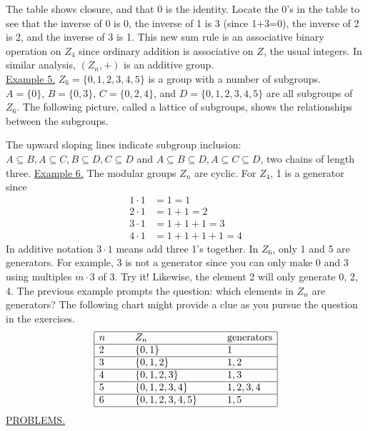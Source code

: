 \documentclass[12pt]{book}
\theoremstyle{definition}
\begin{document}
The table shows closure, and that 0 is the identity.  Locate the 0's in the table to see that the inverse of 0 is 0, the inverse of 1 is 3 (since 1+3=0), the inverse of 2 is 2, and the inverse of 3 is 1.  This new sum rule is an associative binary operation on $Z_4$ since ordinary addition is associative on $Z$, the usual integers.  In similar analysis, $(Z_n,+)$ is an additive group.\\
\underline{Example 5.}  $Z_6 = \{0,1,2,3,4,5\}$ is a group with a number of subgroups.  $A=\{0\},\, B=\{0,3\},\, C=\{0,2,4\}$, and $D=\{0,1,2,3,4,5\}$ are all subgroups of $Z_6$.  The following picture, called a lattice of subgroups, shows the relationships between the subgroups.\\[.1in]
\centerline{}
The upward sloping lines indicate subgroup inclusion: $A\subseteq B, A\subseteq C, B\subseteq D, C\subseteq D$ and $A\subseteq B\subseteq D, A\subseteq C\subseteq D$, two chains of length three.
%
\underline{Example 6.}  The modular groups $Z_n$ are cyclic.  For $Z_4$, 1 is a generator since
\begin{equation*}\begin{split}
1\cdot 1&= 1=1\\
2\cdot 1 &=1+1=2\\
3\cdot 1 &=1+1+1 = 3\\
4\cdot 1 &=1+1+1+1 =4
\end{split}\end{equation*}
In additive notation $3\cdot 1$ means add three 1's together.  In $Z_6$, only 1 and 5 are generators.  For example, 3 is not a generator since you can only make 0 and 3 using multiples $m\cdot3$ of 3.  Try it!  Likewise, the element 2 will only generate 0, 2, 4.  The previous example prompts the question: which elements in $Z_n$ are generators?  The following chart might provide a clue as you pursue the question in the exercises.
$$\begin{array}{|lll|}
\hline
n \qquad& Z_n & \text{generators}\\
\hline
2 & \{0,1\} & 1\\
\hline
3 & \{0,1,2\}  & 1,2\\
\hline
4 & \{0,1,2,3\} & 1,3\\
\hline
5 & \{0,1,2,3,4\} & 1,2,3,4\\
\hline
6 & \{0,1,2,3,4,5\}\qquad & 1, 5\\
\hline
\end{array}$$
\underline{PROBLEMS.}
\end{document}
